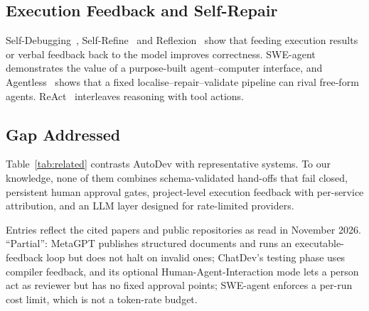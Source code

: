 \documentclass[conference,letterpaper]{IEEEtran}
\begin{document}
\subsection{Execution Feedback and Self-Repair}
Self-Debugging~\cite{chen2024selfdebug}, Self-Refine~\cite{madaan2023selfrefine}
and Reflexion~\cite{shinn2023reflexion} show that feeding execution results or
verbal feedback back to the model improves correctness.
SWE-agent~\cite{yang2024sweagent} demonstrates the value of a purpose-built
agent--computer interface, and Agentless~\cite{xia2024agentless} shows that a
fixed localise--repair--validate pipeline can rival free-form agents.
ReAct~\cite{yao2023react} interleaves reasoning with tool actions.

\subsection{Gap Addressed}
Table~\ref{tab:related} contrasts AutoDev with representative systems. To our
knowledge, none of them combines schema-validated hand-offs that fail closed,
persistent human approval gates, project-level execution feedback with
per-service attribution, and an LLM layer designed for rate-limited providers.

\begin{table}[t]
\caption{Comparison with Representative Systems}
\label{tab:related}
\centering
\footnotesize
\setlength{\tabcolsep}{3pt}
\vspace{2pt}

\raggedright\scriptsize Entries reflect the cited papers and public repositories
as read in November 2026. ``Partial'': MetaGPT publishes structured documents and
runs an executable-feedback loop but does not halt on invalid ones; ChatDev's
testing phase uses compiler feedback, and its optional Human-Agent-Interaction mode
lets a person act as reviewer but has no fixed approval points; SWE-agent enforces
a per-run cost limit, which is not a token-rate budget.
\end{table}
\end{document}
